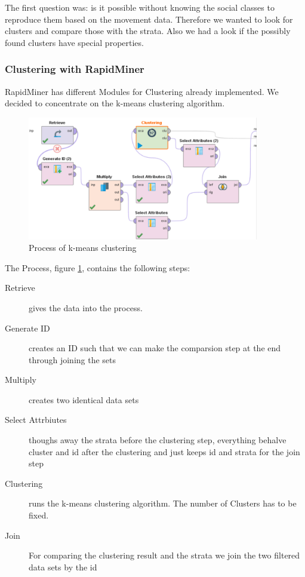 \setlength{\parindent}{0em}
The first question was: is it possible without knowing the social classes to reproduce them based on the movement data. Therefore we wanted to look for clusters and compare those with the strata. Also we had a look if the possibly found clusters have special properties.

\subsubsection{Clustering with RapidMiner}

RapidMiner has different Modules for Clustering already implemented. We decided to concentrate on the k-means clustering algorithm.
\begin{figure}[!htbp]
\centering
\includegraphics[width=0.9\textwidth]{ClusteringRapid.PNG}
\caption{Process of k-means clustering}
\label{fig: kclust}
\end{figure}


The Process, figure \ref{fig: kclust}, contains the following steps:
\begin{description}
	\item[Retrieve] gives the data into the process. 
  \item[Generate ID] creates an ID such that we can make the comparsion step at the end through joining the sets
  \item[Multiply] creates two identical data sets
  \item[Select Attrbiutes] thoughs away the strata before the clustering step, everything behalve cluster and id after the clustering and just keeps id and strata for the join step
	\item[Clustering] runs the k-means clustering algorithm. The number of Clusters has to be fixed.
	\item[Join] For comparing the clustering result and the strata we join the two filtered data sets by the id
\end{description}

